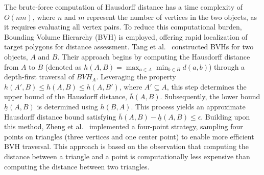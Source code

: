 The brute-force computation of Hausdorff distance has a time complexity of $O(nm)$, where $n$ and $m$ represent the number of vertices in the two objects, as it requires evaluating all vertex pairs.
To reduce this computational burden, Bounding Volume Hierarchy (BVH) is employed, offering rapid localization of target polygons for distance assessment.
%
Tang et al.~\cite{SIG09HIST} constructed BVHs for two objects, $A$ and $B$.
Their approach begins by computing the Hausdorff distance from $A$ to $B$ (denoted as $h(A,B) = \max_{a \in A} \min_{b \in B} d(a,b)$) through a depth-first traversal of $BVH_A$.
Leveraging the property $h(A', B) \leq h(A, B) \leq h(A, B')$, where $A' \subseteq A$, this step determines the upper bound of the Hausdorff distance, $\overline{h}(A,B)$.
Subsequently, the lower bound $\underline{h}(A,B)$ is determined using $h(B,A)$.
This process yields an approximate Hausdorff distance bound satisfying $\overline{h}(A, B) - \underline{h}(A, B) \leq \epsilon$.
%
Building upon this method, Zheng et al.~\cite{zheng2022economic} implemented a four-point strategy, sampling four points on triangles (three vertices and one center point) to enable more efficient BVH traversal.
This approach is based on the observation that computing the distance between a triangle and a point is computationally less expensive than computing the distance between two triangles.



